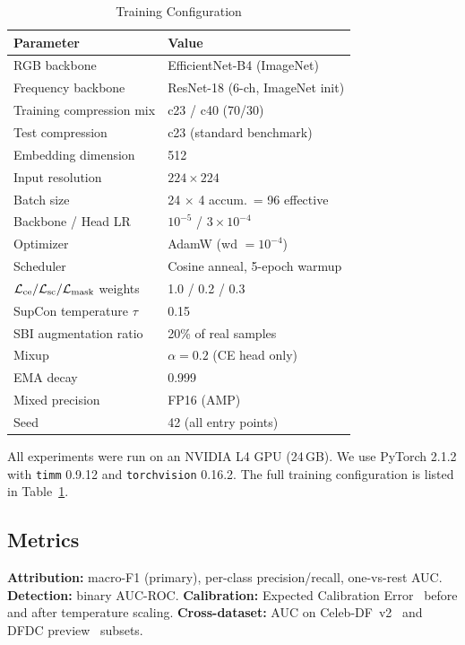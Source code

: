 \begin{table}[t]
\centering
\caption{Training Configuration}
\label{tab:config}
\begin{tabular}{@{}ll@{}}
\toprule
\textbf{Parameter} & \textbf{Value} \\
\midrule
RGB backbone & EfficientNet-B4 (ImageNet) \\
Frequency backbone & ResNet-18 (6-ch, ImageNet init) \\
Training compression mix & c23 / c40 (70/30) \\
Test compression & c23 (standard benchmark) \\
Embedding dimension & 512 \\
Input resolution & $224 \times 224$ \\
Batch size & 24 $\times$ 4 accum.\ = 96 effective \\
Backbone / Head LR & $10^{-5}$ / $3\!\times\!10^{-4}$ \\
Optimizer & AdamW (wd $= 10^{-4}$) \\
Scheduler & Cosine anneal, 5-epoch warmup \\
$\mathcal{L}_{\text{ce}} / \mathcal{L}_{\text{sc}} / \mathcal{L}_{\text{mask}}$ weights & 1.0 / 0.2 / 0.3 \\
SupCon temperature $\tau$ & 0.15 \\
SBI augmentation ratio & 20\% of real samples \\
Mixup~\cite{zhang2018mixup} & $\alpha\!=\!0.2$ (CE head only) \\
EMA decay & 0.999 \\
Mixed precision & FP16 (AMP) \\
Seed & 42 (all entry points) \\
\bottomrule
\end{tabular}
\end{table}

All experiments were run on an NVIDIA L4 GPU (24\,GB). We use PyTorch 2.1.2 with \texttt{timm} 0.9.12 and \texttt{torchvision} 0.16.2. The full training configuration is listed in Table~\ref{tab:config}.

\subsection{Metrics}
\textbf{Attribution:} macro-F1 (primary), per-class precision/recall, one-vs-rest AUC.  \textbf{Detection:} binary AUC-ROC.  \textbf{Calibration:} Expected Calibration Error~\cite{guo2017calibration} before and after temperature scaling.  \textbf{Cross-dataset:} AUC on Celeb-DF~v2~\cite{li2020celebdf} and DFDC preview~\cite{dolhansky2020dfdc} subsets.

